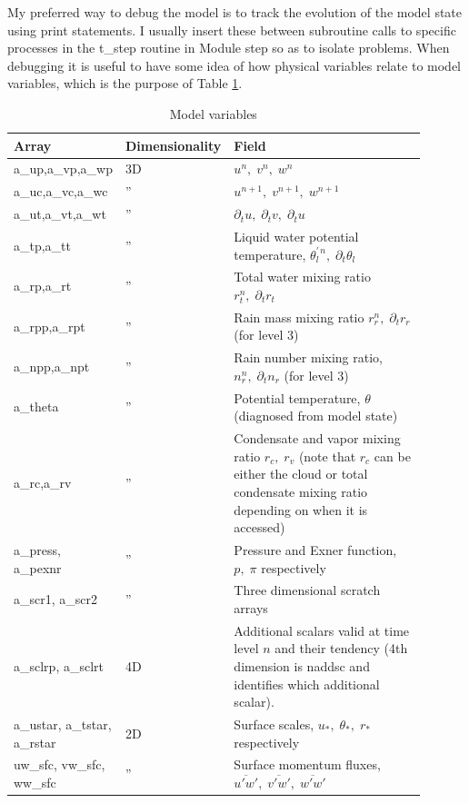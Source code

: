 \documentclass[11pt,a4paper]{article}
\begin{document}
My preferred way to debug the model is to track the evolution of the
model state using print statements.  I usually insert these between
subroutine calls to specific processes in the t\_step routine in
Module step so as to isolate problems.  When debugging it is useful to
have some idea of how physical variables relate to model variables,
which is the purpose of Table \ref{tbl:variables}.


\begin{longtable}[htb]{p{0.15\linewidth}p{0.15\linewidth}p{0.6\linewidth}}
\caption{Model variables} \label{tbl:variables}
\\ \hline \hline 
Array    & Dimensionality & Field \\ \hline \endhead
a\_up,a\_vp,a\_wp & 3D    & $u^n, \; v^n, \;w^n$ \\
a\_uc,a\_vc,a\_wc & ''    & $u^{n+1}, \;v^{n+1}, \;w^{n+1}$ \\
a\_ut,a\_vt,a\_wt & ''    & $\partial_t u, \; \partial_t v, 
\; \partial_t u$ \\  
a\_tp,a\_tt  & ''         & Liquid water potential temperature,
$\theta_l^{'\, n}, \;  \partial_t \theta_l$ \\ 
a\_rp,a\_rt  & ''         & Total water mixing ratio $r_t^n, \;
\partial_t r_t$ \\ 
a\_rpp,a\_rpt  & ''       & Rain mass mixing ratio $r_r^n, \;
\partial_t r_r$   (for level 3)\\  
a\_npp,a\_npt  & ''       & Rain number mixing ratio, $n_r^n, \;
\partial_t n_r$ (for level 3) \\  
a\_theta & '' & Potential temperature, $\theta$ (diagnosed from model state)
\\  
a\_rc,a\_rv  & ''         & Condensate and vapor mixing ratio $r_c, \;
r_v$ (note that $r_c$ can be either the cloud or total condensate
mixing ratio depending on when it is accessed) \\ 
a\_press, a\_pexnr & ''   & Pressure and Exner function, $p, \; \pi$
respectively  \\  
a\_scr1, a\_scr2 & '' & Three dimensional scratch arrays \\
a\_sclrp, a\_sclrt & 4D  & Additional scalars valid at time level $n$ and their tendency (4th dimension is naddsc and identifies which additional scalar). \\
a\_ustar, a\_tstar, a\_rstar & 2D & Surface scales, $u_*, \;
\theta_*, \; r_*$ respectively \\ 
uw\_sfc, vw\_sfc, ww\_sfc & '' & Surface momentum fluxes,
$\overline{u'w'}, \;\overline{v'w'}, \;\overline{w'w'} $

\end{longtable}
\end{document}
